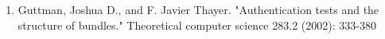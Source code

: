 \begin{enumerate}

\item Guttman, Joshua D., and F. Javier Thayer. "Authentication tests and the structure of bundles." Theoretical computer science 283.2 (2002): 333-380
\end{enumerate}